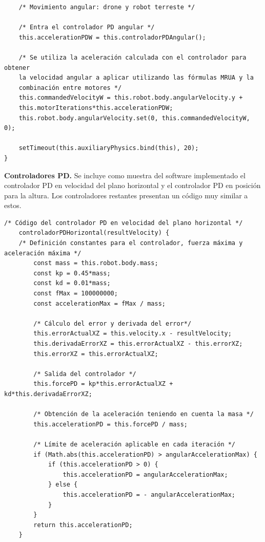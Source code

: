 {\begin{verbatim}
    /* Movimiento angular: drone y robot terreste */
    
    /* Entra el controlador PD angular */              
    this.accelerationPDW = this.controladorPDAngular();
    
    /* Se utiliza la aceleración calculada con el controlador para obtener 
    la velocidad angular a aplicar utilizando las fórmulas MRUA y la 
    combinación entre motores */
    this.commandedVelocityW = this.robot.body.angularVelocity.y + 
    this.motorIterations*this.accelerationPDW;
    this.robot.body.angularVelocity.set(0, this.commandedVelocityW, 0);
    
    setTimeout(this.auxiliaryPhysics.bind(this), 20);
}
\end{verbatim}
}
\normalsize
\textbf{Controladores PD.} Se incluye como muestra del software implementado el controlador PD en velocidad del plano horizontal y el controlador PD en posición para la altura. Los controladores restantes presentan un código muy similar a estos.

\footnotesize {
\begin{verbatim}
/* Código del controlador PD en velocidad del plano horizontal */
    controladorPDHorizontal(resultVelocity) {
    /* Definición constantes para el controlador, fuerza máxima y aceleración máxima */
        const mass = this.robot.body.mass;
        const kp = 0.45*mass;
        const kd = 0.01*mass;
        const fMax = 100000000;
        const accelerationMax = fMax / mass;

        /* Cálculo del error y derivada del error*/
        this.errorActualXZ = this.velocity.x - resultVelocity;
        this.derivadaErrorXZ = this.errorActualXZ - this.errorXZ;
        this.errorXZ = this.errorActualXZ;

        /* Salida del controlador */
        this.forcePD = kp*this.errorActualXZ + kd*this.derivadaErrorXZ;
        
        /* Obtención de la aceleración teniendo en cuenta la masa */
        this.accelerationPD = this.forcePD / mass;

        /* Límite de aceleración aplicable en cada iteración */
        if (Math.abs(this.accelerationPD) > angularAccelerationMax) {
            if (this.accelerationPD > 0) {
                this.accelerationPD = angularAccelerationMax;
            } else {
                this.accelerationPD = - angularAccelerationMax;
            }
        }
        return this.accelerationPD;
    }
\end{verbatim}
}

